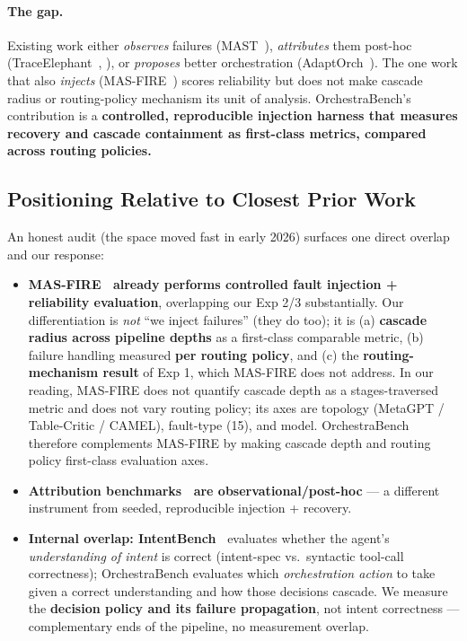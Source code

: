 \documentclass[sigconf,nonacm,anonymous]{acmart}  %
\begin{document}
\paragraph{The gap.} Existing work either \emph{observes} failures
(MAST~\cite{mast}), \emph{attributes} them post-hoc
(TraceElephant~\cite{traceelephant}, \cite{attribution}), or \emph{proposes}
better orchestration (AdaptOrch~\cite{adaptorch}). The one work that also
\emph{injects} (MAS-FIRE~\cite{masfire}) scores reliability but does not make
cascade radius or routing-policy mechanism its unit of analysis. OrchestraBench's
contribution is a \textbf{controlled, reproducible injection harness that
measures recovery and cascade containment as first-class metrics, compared across
routing policies.}

\subsection{Positioning Relative to Closest Prior Work}
\label{sec:novelty}
An honest audit (the space moved fast in early 2026) surfaces one direct overlap
and our response:
\begin{itemize}
  \item \textbf{MAS-FIRE~\cite{masfire} already performs controlled fault
  injection + reliability evaluation}, overlapping our Exp 2/3 substantially. Our
  differentiation is \emph{not} ``we inject failures'' (they do too); it is (a)
  \textbf{cascade radius across pipeline depths} as a first-class comparable
  metric, (b) failure handling measured \textbf{per routing policy}, and (c) the
  \textbf{routing-mechanism result} of Exp 1, which MAS-FIRE does not address. In
  our reading, MAS-FIRE does not quantify cascade depth as a stages-traversed
  metric and does not vary routing policy; its axes are topology (MetaGPT /
  Table-Critic / CAMEL), fault-type (15), and model. OrchestraBench therefore
  complements MAS-FIRE by making cascade depth and routing policy first-class
  evaluation axes.
  \item \textbf{Attribution benchmarks~\cite{traceelephant,attribution} are
  observational/post-hoc} --- a different instrument from seeded, reproducible
  injection + recovery.
  \item \textbf{Internal overlap: IntentBench~\cite{intentbench}} evaluates
  whether the agent's \emph{understanding of intent} is correct (intent-spec vs.\
  syntactic tool-call correctness); OrchestraBench evaluates which
  \emph{orchestration action} to take given a correct understanding and how those
  decisions cascade. We measure the \textbf{decision policy and its failure
  propagation}, not intent correctness --- complementary ends of the pipeline,
  no measurement overlap.
\end{itemize}
\end{document}
